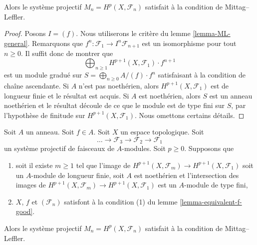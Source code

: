 {\begin{lemma}
\begin{enumerate}
\end{enumerate}

Alors le système projectif $M_n = H^p(X, \mathcal{F}_n)$ satisfait à la condition de Mittag--Leffler.

\end{lemma}

\begin{proof}

Posons $I = (f)$. Nous utiliserons le critère du lemme \ref{lemma-ML-general}. Remarquons que
$f^n : \mathcal{F}_1 \to I^n\mathcal{F}_{n + 1}$
est un isomorphisme pour tout $n \geq 0$. Il suffit donc de montrer que
$$
\bigoplus\nolimits_{n \geq 1} H^{p + 1}(X, \mathcal{F}_1) \cdot f^{n + 1}
$$
est un module gradué sur $S = \bigoplus_{n \geq 0} A/(f) \cdot f^n$ satisfaisant à la condition de chaîne ascendante. Si $A$ n'est pas noethérien, alors
$H^{p + 1}(X, \mathcal{F}_1)$ est de longueur finie et le résultat est acquis. Si $A$ est noethérien, alors $S$ est un anneau noethérien et le résultat découle de ce que le module est de type fini sur $S$, par l'hypothèse de finitude sur $H^{p + 1}(X, \mathcal{F}_1)$. Nous omettons certains détails.

\end{proof}

\begin{lemma}

\label{lemma-ML-better}

Soit $A$ un anneau. Soit $f \in A$. Soit $X$ un espace topologique. Soit
$$
\ldots \to \mathcal{F}_3 \to \mathcal{F}_2 \to \mathcal{F}_1
$$
un système projectif de faisceaux de $A$-modules. Soit $p \geq 0$. Supposons que

\begin{enumerate}

\item soit il existe $m \geq 1$ tel que l'image de
$H^{p + 1}(X, \mathcal{F}_m) \to H^{p + 1}(X, \mathcal{F}_1)$
soit un $A$-module de longueur finie, soit $A$ est noethérien et l'intersection des images de
$H^{p + 1}(X, \mathcal{F}_m) \to H^{p + 1}(X, \mathcal{F}_1)$
est un $A$-module de type fini,
\item $X$, $f$ et $(\mathcal{F}_n)$ satisfont à la condition (1) du lemme \ref{lemma-equivalent-f-good}.

\end{enumerate}

Alors le système projectif $M_n = H^p(X, \mathcal{F}_n)$ satisfait à la condition de Mittag--Leffler.

\end{lemma}

}
